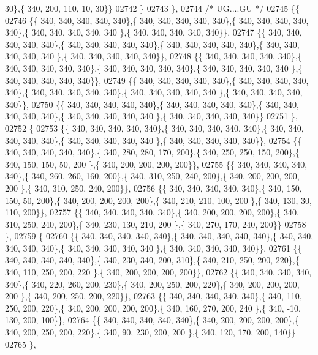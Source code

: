 \begin{DoxyCode}
      30\},\{ 340, 200, 110,  10,  30\}\}
02742 \}
02743 \},
02744 \textcolor{comment}{/* UG....GU */}
02745 \{\{
02746 \{\{ 340, 340, 340, 340, 340\},\{ 340, 340, 340, 340, 340\},\{ 340, 340, 340, 340, 340\},\{ 340, 340, 340, 340, 340
      \},\{ 340, 340, 340, 340, 340\}\},
02747 \{\{ 340, 340, 340, 340, 340\},\{ 340, 340, 340, 340, 340\},\{ 340, 340, 340, 340, 340\},\{ 340, 340, 340, 340, 340
      \},\{ 340, 340, 340, 340, 340\}\},
02748 \{\{ 340, 340, 340, 340, 340\},\{ 340, 340, 340, 340, 340\},\{ 340, 340, 340, 340, 340\},\{ 340, 340, 340, 340, 340
      \},\{ 340, 340, 340, 340, 340\}\},
02749 \{\{ 340, 340, 340, 340, 340\},\{ 340, 340, 340, 340, 340\},\{ 340, 340, 340, 340, 340\},\{ 340, 340, 340, 340, 340
      \},\{ 340, 340, 340, 340, 340\}\},
02750 \{\{ 340, 340, 340, 340, 340\},\{ 340, 340, 340, 340, 340\},\{ 340, 340, 340, 340, 340\},\{ 340, 340, 340, 340, 340
      \},\{ 340, 340, 340, 340, 340\}\}
02751 \},
02752 \{
02753 \{\{ 340, 340, 340, 340, 340\},\{ 340, 340, 340, 340, 340\},\{ 340, 340, 340, 340, 340\},\{ 340, 340, 340, 340, 340
      \},\{ 340, 340, 340, 340, 340\}\},
02754 \{\{ 340, 340, 340, 340, 340\},\{ 340, 280, 280, 170, 200\},\{ 340, 250, 250, 150, 200\},\{ 340, 150, 150,  50, 200
      \},\{ 340, 200, 200, 200, 200\}\},
02755 \{\{ 340, 340, 340, 340, 340\},\{ 340, 260, 260, 160, 200\},\{ 340, 310, 250, 240, 200\},\{ 340, 200, 200, 200, 200
      \},\{ 340, 310, 250, 240, 200\}\},
02756 \{\{ 340, 340, 340, 340, 340\},\{ 340, 150, 150,  50, 200\},\{ 340, 200, 200, 200, 200\},\{ 340, 210, 210, 100, 200
      \},\{ 340, 130,  30, 110, 200\}\},
02757 \{\{ 340, 340, 340, 340, 340\},\{ 340, 200, 200, 200, 200\},\{ 340, 310, 250, 240, 200\},\{ 340, 230, 130, 210, 200
      \},\{ 340, 270, 170, 240, 200\}\}
02758 \},
02759 \{
02760 \{\{ 340, 340, 340, 340, 340\},\{ 340, 340, 340, 340, 340\},\{ 340, 340, 340, 340, 340\},\{ 340, 340, 340, 340, 340
      \},\{ 340, 340, 340, 340, 340\}\},
02761 \{\{ 340, 340, 340, 340, 340\},\{ 340, 230, 340, 200, 310\},\{ 340, 210, 250, 200, 220\},\{ 340, 110, 250, 200, 220
      \},\{ 340, 200, 200, 200, 200\}\},
02762 \{\{ 340, 340, 340, 340, 340\},\{ 340, 220, 260, 200, 230\},\{ 340, 200, 250, 200, 220\},\{ 340, 200, 200, 200, 200
      \},\{ 340, 200, 250, 200, 220\}\},
02763 \{\{ 340, 340, 340, 340, 340\},\{ 340, 110, 250, 200, 220\},\{ 340, 200, 200, 200, 200\},\{ 340, 160, 270, 200, 240
      \},\{ 340, -10, 130, 200, 100\}\},
02764 \{\{ 340, 340, 340, 340, 340\},\{ 340, 200, 200, 200, 200\},\{ 340, 200, 250, 200, 220\},\{ 340,  90, 230, 200, 200
      \},\{ 340, 120, 170, 200, 140\}\}
02765 \},

\end{DoxyCode}
